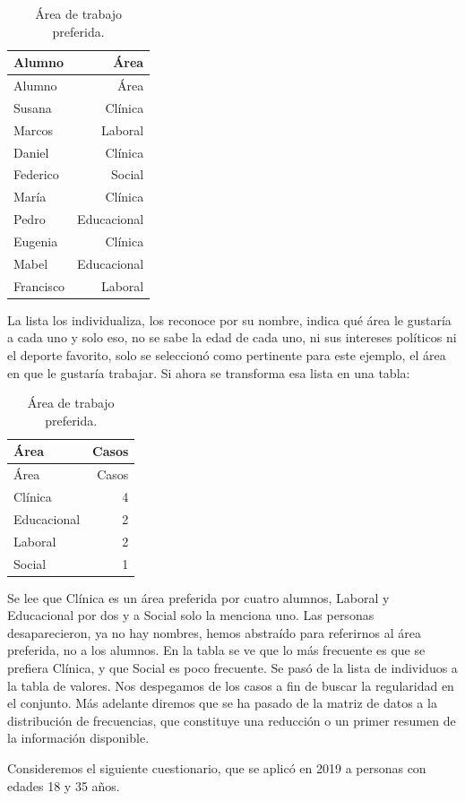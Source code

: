 \documentclass[]{book}
\begin{document}
\begin{longtable}[]{@{}lr@{}}
\caption{\label{tab:unnamed-chunk-2}Área de trabajo preferida.}\tabularnewline
\toprule
Alumno & Área\tabularnewline
\midrule
\endfirsthead
\toprule
Alumno & Área\tabularnewline
\midrule
\endhead
Susana & Clínica\tabularnewline
Marcos & Laboral\tabularnewline
Daniel & Clínica\tabularnewline
Federico & Social\tabularnewline
María & Clínica\tabularnewline
Pedro & Educacional\tabularnewline
Eugenia & Clínica\tabularnewline
Mabel & Educacional\tabularnewline
Francisco & Laboral\tabularnewline
\bottomrule
\end{longtable}

La lista los individualiza, los reconoce por su nombre, indica qué área le gustaría a cada uno y solo eso, no se sabe la edad de cada uno, ni sus intereses políticos ni el deporte favorito, solo se seleccionó como pertinente para este ejemplo, el área en que le gustaría trabajar. Si ahora se transforma esa lista en una tabla:

\begin{longtable}[]{@{}lr@{}}
\caption{\label{tab:unnamed-chunk-3}Área de trabajo preferida.}\tabularnewline
\toprule
Área & Casos\tabularnewline
\midrule
\endfirsthead
\toprule
Área & Casos\tabularnewline
\midrule
\endhead
Clínica & 4\tabularnewline
Educacional & 2\tabularnewline
Laboral & 2\tabularnewline
Social & 1\tabularnewline
\bottomrule
\end{longtable}

Se lee que Clínica es un área preferida por cuatro alumnos, Laboral y Educacional por dos y a Social solo la menciona uno. Las personas desaparecieron, ya no hay nombres, hemos abstraído para referirnos al área preferida, no a los alumnos. En la tabla se ve que lo más frecuente es que se prefiera Clínica, y que Social es poco frecuente. Se pasó de la lista de individuos a la tabla de valores. Nos despegamos de los casos a fin de buscar la regularidad en el conjunto. Más adelante diremos que se ha pasado de la matriz de datos a la distribución de frecuencias, que constituye una reducción o un primer resumen de la información disponible.

Consideremos el siguiente cuestionario, que se aplicó en 2019 a personas con edades 18 y 35 años.
\end{document}
